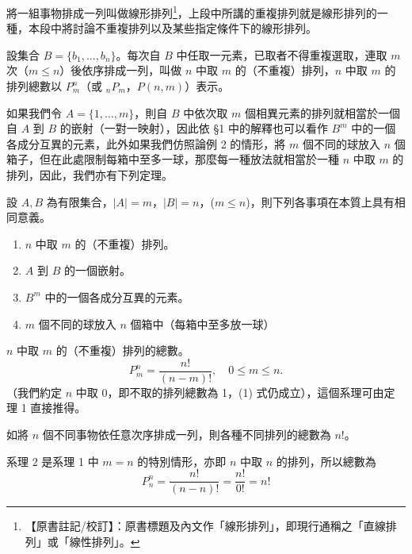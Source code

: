 將一組事物排成一列叫做線形排列\label{note:b5-ch2-linear-perm}\footnote{【原書註記/校訂】：原書標題及內文作「線形排列」，即現行通稱之「直線排列」或「線性排列」。}，上段中所講的重複排列就是線形排列的一種，本段中將討論不重複排列以及某些指定條件下的線形排列。

\begin{definition*}
設集合 $B=\{b_1, \dots, b_n\}$。每次自 $B$ 中任取一元素，已取者不得重複選取，連取 $m$ 次（$m \le n$）後依序排成一列，叫做 $n$ 中取 $m$ 的（不重複）排列，$n$ 中取 $m$ 的排列總數以 $P_m^n$（或 $_n P_m$，$P(n,m)$）表示。
\end{definition*}

如果我們令 $A=\{1, \dots, m\}$，則自 $B$ 中依次取 $m$ 個相異元素的排列就相當於一個自 $A$ 到 $B$ 的嵌射（一對一映射），因此依 \S 1 中的解釋也可以看作 $B^m$ 中的一個各成分互異的元素，此外如果我們仿照論例 2 的情形，將 $m$ 個不同的球放入 $n$ 個箱子，但在此處限制每箱中至多一球，那麼每一種放法就相當於一種 $n$ 中取 $m$ 的排列，因此，我們亦有下列定理。

\begin{theorem}\label{thm:b5-2-5}
設 $A, B$ 為有限集合，$|A|=m$，$|B|=n$，($m \le n$)，則下列各事項在本質上具有相同意義。
\begin{enumerate}[label=\Roman*., itemsep=2pt, topsep=2pt]
  \item $n$ 中取 $m$ 的（不重複）排列。
  \item $A$ 到 $B$ 的一個嵌射。
  \item $B^m$ 中的一個各成分互異的元素。
  \item $m$ 個不同的球放入 $n$ 個箱中（每箱中至多放一球）
\end{enumerate}
\end{theorem}

\begin{corollary}\label{cor:b5-2-1}
$n$ 中取 $m$ 的（不重複）排列的總數。
\begin{equation}
P_m^n = \frac{n!}{(n-m)!}, \quad 0 \le m \le n.
\end{equation}
（我們約定 $n$ 中取 0，即不取的排列總數為 1，(1) 式仍成立），這個系理可由定理 1 直接推得。
\end{corollary}

\begin{corollary}\label{cor:b5-2-2}
如將 $n$ 個不同事物依任意次序排成一列，則各種不同排列的總數為 $n!$。
\end{corollary}

\indent 系理 2 是系理 1 中 $m=n$ 的特別情形，亦即 $n$ 中取 $n$ 的排列，所以總數為
\[
P_n^n = \frac{n!}{(n-n)!} = \frac{n!}{0!} = n!
\]


